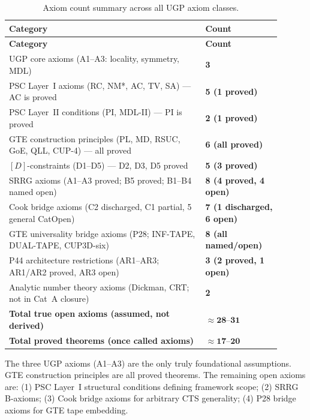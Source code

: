 \begingroup\footnotesize\renewcommand{\arraystretch}{1.2}
\begin{longtable}{@{}P{0.65\linewidth}P{0.25\linewidth}@{}}
\caption{Axiom count summary across all UGP axiom classes.}
\label{tab:mi-axiom-counts}\\
\toprule
\textbf{Category} & \textbf{Count} \\
\midrule
\endfirsthead
\midrule
\textbf{Category} & \textbf{Count} \\
\midrule
\endhead
\bottomrule
\endfoot
UGP core axioms (A1--A3: locality, symmetry, MDL) & \textbf{3} \\
PSC Layer~I axioms (RC, NM*, AC, TV, SA) — AC is proved & \textbf{5 (1 proved)} \\
PSC Layer~II conditions (PI, MDL-II) — PI is proved & \textbf{2 (1 proved)} \\
GTE construction principles (PL, MD, RSUC, GoE, QLL, CUP-4) — all proved &
  \textbf{6 (all proved)} \\
$[D]$-constraints (D1--D5) — D2, D3, D5 proved & \textbf{5 (3 proved)} \\
SRRG axioms (A1--A3 proved; B5 proved; B1--B4 named open) & \textbf{8 (4 proved, 4 open)} \\
Cook bridge axioms (C2 discharged, C1 partial, 5 general CatOpen) &
  \textbf{7 (1 discharged, 6 open)} \\
GTE universality bridge axioms (P28; INF-TAPE, DUAL-TAPE, CUP3D-six) &
  \textbf{8 (all named/open)} \\
P44 architecture restrictions (AR1--AR3; AR1/AR2 proved, AR3 open) & \textbf{3 (2 proved, 1 open)} \\
Analytic number theory axioms (Dickman, CRT; not in Cat~A closure) & \textbf{2} \\
\midrule
\textbf{Total true open axioms (assumed, not derived)} & $\approx\mathbf{28}$--$\mathbf{31}$ \\
\textbf{Total proved theorems (once called axioms)} & $\approx\mathbf{17}$--$\mathbf{20}$ \\
\end{longtable}
\endgroup

\noindent The three UGP axioms (A1--A3) are the only truly foundational assumptions.
GTE construction principles are all proved theorems. The remaining open axioms are:
(1) PSC Layer~I structural conditions defining framework scope; (2) SRRG B-axioms;
(3) Cook bridge axioms for arbitrary CTS generality; (4) P28 bridge axioms for GTE
tape embedding.

